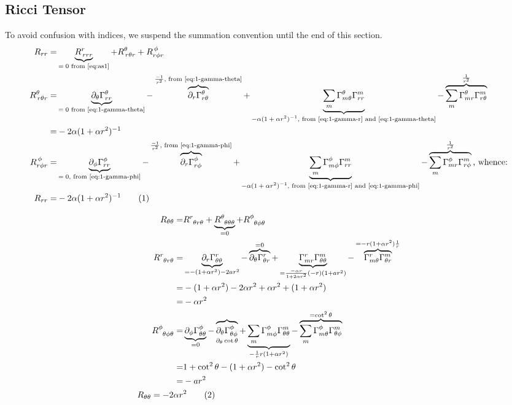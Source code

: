 \documentclass[]{article}
\newcommand\numberthis{\addtocounter{equation}{1}\tag{\theequation}}
\begin{document}
\subsection{Ricci Tensor}\label{section:ricci-1}
To avoid confusion with indices, we suspend the summation convention until the end of this section.
\begin{align*}
R_{rr}=&\underbrace{R^r_{\,rrr}}_\text{$=0$ from \eqref{eq:as1}}+R^{\theta}_{\,r\theta r}+R^{\,\phi}_{r\phi r}\\
R^{\theta}_{\,r\theta r}=&\underbrace{\partial_{\theta}\Gamma^{\theta}_{rr}}_\text{$=0$ from \eqref{eq:1-gamma-theta}}-\overbrace{\partial_r\Gamma^{\theta}_{r\theta}}^\text{$\frac{-1}{r^2}$, from \eqref{eq:1-gamma-theta}}+\underbrace{\sum_m\Gamma^{\theta}_{m\theta}\Gamma^{m}_{rr}}_\text{$- \alpha (1+\alpha r^2)^{-1}$, from \eqref{eq:1-gamma-r} and \eqref{eq:1-gamma-theta}}-\overbrace{\sum_m\Gamma^{\theta}_{mr}\Gamma^m_{r\theta}}^\text{$\frac{1}{r^2}$}\\
=&-2 \alpha (1+\alpha r^2)^{-1}\\
R^{\,\phi}_{r\phi r}=&\underbrace{\partial_{\phi}\Gamma^{\phi}_{rr}}_\text{$=0$, from \eqref{eq:1-gamma-phi}}-\overbrace{\partial_r\Gamma^{\phi}_{r\phi}}^\text{$\frac{-1}{r^2}$, from \eqref{eq:1-gamma-phi}}+\underbrace{\sum_m\Gamma^{\phi}_{m\phi}\Gamma^{m}_{rr}}_\text{$- \alpha (1+\alpha r^2)^{-1}$, from \eqref{eq:1-gamma-r} and \eqref{eq:1-gamma-phi}}-\overbrace{\sum_m\Gamma^{\phi}_{mr}\Gamma^m_{r\phi}}^\text{$\frac{1}{r^2}$}\text{, whence:}\\
R_{rr}=&-2 \alpha (1+\alpha r^2)^{-1}\numberthis\label{eq:R-r-r}
\end{align*}

\begin{align*}
R_{\theta\theta}=&R\indices{^r_{\theta r\theta}}+\underbrace{R\indices{^{\theta}_{\theta\theta\theta}}}_{=0}+R\indices{^{\phi}_{\theta\phi\theta}}\\
R\indices{^r_{\theta r \theta}}=&\underbrace{\partial_r\Gamma^r_{\theta\theta}}_{=-(1+\alpha r^2)-2ar^2}-\overbrace{\partial_\theta\Gamma^r_{\theta r}}^{=0}+\underbrace{\Gamma^r_{mr}\Gamma^m_{\theta\theta}}_{=\frac{-\alpha r}{1+2\alpha r^2}(-r)(1+ar^2)}-\overbrace{\Gamma^r_{m\theta}\Gamma^m_{\theta r}}^{=-r(1+\alpha r^2)\frac{1}{r}}\\
=&-(1+\alpha r^2)-2\alpha r^2 + \alpha r^2+(1+\alpha r^2)\\
=&-\alpha r^2\\
R\indices{^{\phi}_{\theta\phi\theta}}=&\underbrace{\partial_{\phi}\Gamma^{\phi}_{\theta\theta}}_{=0}-\overbrace{\partial_{\theta}\Gamma^{\phi}_{\theta\phi}}_{\partial_{\theta}\cot\theta}+\underbrace{\sum_m\Gamma^{\phi}_{m\phi}\Gamma^m_{\theta\theta}}_{-\frac{1}{r}r(1+\alpha r^2)}-\overbrace{\sum_m\Gamma^{\phi}_{m\theta}\Gamma^{m}_{\theta\phi}}^{=\cot^2\theta}\\
=&1+\cot^2\theta-(1+\alpha r^2)-\cot^2\theta\\
=&-ar^2\\
R_{\theta\theta} = -2 \alpha r&^2\numberthis\label{eq:R-theta-theta}
\end{align*}
\end{document}
